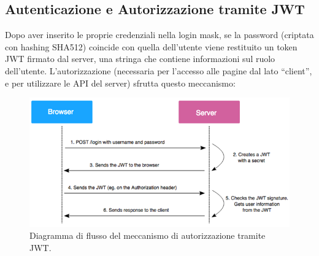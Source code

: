 \documentclass[a4paper, 11pt]{article}
\begin{document}
\subsection{Autenticazione e Autorizzazione tramite JWT}
Dopo aver inserito le proprie credenziali nella login mask, se la password (criptata con hashing SHA512) coincide con quella dell'utente viene restituito un token JWT firmato dal server, una stringa che contiene informazioni sul ruolo dell'utente. L'autorizzazione (necessaria per l'accesso alle pagine dal lato “client”, e per utilizzare le API del server) sfrutta questo meccanismo:
\begin{figure}[H]
    \centering
    \includegraphics[width=\textwidth]{auth}
    \caption{Diagramma di flusso del meccanismo di autorizzazione tramite JWT.}
\end{figure}
\end{document}
